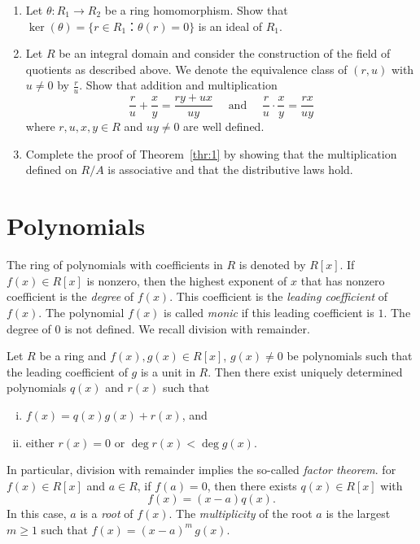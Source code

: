 \begin{enumerate}
\item Let $θ: R_1 → R_2$ be a ring homomorphism. Show that $\ker(θ) = \{ r ∈ R_1 ：θ(r) = 0 \}$ is an ideal of $R_1$. 
\item Let $R$ be an integral domain and consider the construction of the field  of quotients as described above. We denote the equivalence class of $(r,u)$ with $u ≠0$ by $\frac{r}{u}$. Show that addition and multiplication
  \begin{displaymath}
    \frac{r}{u} + \frac{x}{y} = \frac{ry + ux}{uy} \quad  \text{ and } \quad  \frac{r}{u} ⋅ \frac{x}{y} = \frac{rx}{uy} 
  \end{displaymath}
  where $r,u,x,y ∈R$ and $uy ≠0$ are well defined. 
\item Complete the proof of Theorem~\ref{thr:1} by showing that the multiplication defined on $R/A$ is associative and that the distributive laws hold.
\end{enumerate}



\section{Polynomials}
\label{sec:polynomials}

The ring of polynomials with coefficients in $R$ is denoted by $R[x]$. If $f(x) ∈ R[x]$ is nonzero, then the highest exponent of $x$ that has nonzero coefficient is the \emph{degree} of $f(x)$. This coefficient is the \emph{leading coefficient} of $f(x)$. The polynomial $f(x)$ is called \emph{monic} if this leading coefficient is $1$. The degree of $0$ is not defined.  We recall division with remainder. 
\begin{theorem}
  \label{thr:5}
  Let $R$ be a ring and $f(x),g(x)∈R[x]$, $g(x) ≠0$  be polynomials such that the leading coefficient of $g$ is a unit in $R$. Then there exist uniquely determined polynomials $q(x)$ and $r(x)$ such that
  \begin{enumerate}[i)]
  \item $f(x) = q(x) g(x) + r(x)$, and
  \item either $r(x) = 0$ or $\deg r(x) < \deg g(x)$.
  \end{enumerate}
\end{theorem}
%
In particular, division with remainder implies the so-called \emph{factor theorem}. for $f(x) ∈ R[x]$ and $a ∈R$, if $f(a) = 0$, then there exists $q(x) ∈ R[x]$ with
\begin{displaymath}
  f(x) = (x - a) q(x). 
\end{displaymath}
In this case, $a$ is a \emph{root} of $f(x)$. The \emph{multiplicity} of the root $a$ is the largest $m≥1$ such that $f(x) = (x-a)^m \, g(x)$.

